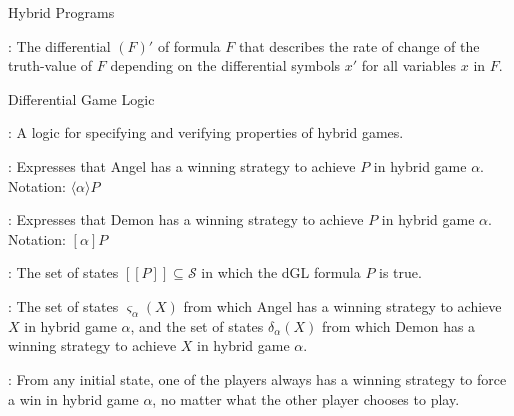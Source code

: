 \documentclass[hidelinks]{article}
\begin{document}
\begin{smodule}[title={Hybrid Systems}]{Hybrid Programs}
    \begin{sdefinition}[for=Differential]
        : The differential $(F)'$ of formula $F$ that describes the rate of change of the truth-value of $F$ depending on the differential symbols $x'$ for all variables $x$ in $F$.
    \end{sdefinition}
\end{smodule}

\begin{smodule}[title={Differential Game Logic}]{Differential Game Logic}
    \begin{sdefinition}[for=DifferentialGameLogic]
        : A logic for specifying and verifying properties of hybrid games.
    \end{sdefinition}

    \begin{sdefinition}[for=DiamondModality]
        : Expresses that Angel has a winning strategy to achieve $P$ in hybrid game $\alpha$. Notation: $\langle \alpha \rangle P$
    \end{sdefinition}

    \begin{sdefinition}[for=BoxModality]
        : Expresses that Demon has a winning strategy to achieve  $P$ in hybrid game $\alpha$. Notation: $[\alpha] P$
    \end{sdefinition}

    \begin{sdefinition}[for=Semantics]
        : The set of states $[\![P]\!] \subseteq \mathcal{S}$ in which the dGL formula $P$ is true. 
    \end{sdefinition}

    \begin{sdefinition}[for=WinningRegion]
        : The set of states $\varsigma_\alpha(X)$ from which Angel has a winning strategy to achieve $X$ in hybrid game $\alpha$, and the set of states $\delta_\alpha(X)$ from which Demon has a winning strategy to achieve $X$ in hybrid game $\alpha$.
    \end{sdefinition}

    \begin{sdefinition}[for=Determinacy]
        : From any initial state, one of the players always has a winning strategy to force a win in hybrid game $\alpha$, no matter what the other player chooses to play. 
    \end{sdefinition}
\end{smodule}
\end{document}
